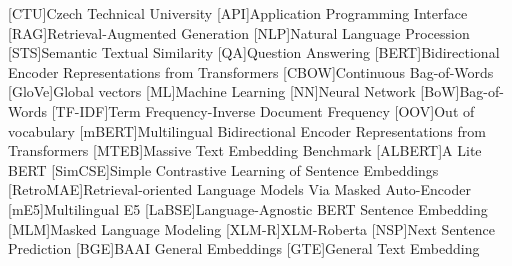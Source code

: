 
\begin{acronym}
  [CTU]{Czech Technical University}
  [API]{Application Programming Interface}
  [RAG]{Retrieval-Augmented Generation}
  [NLP]{Natural Language Procession}
  [STS]{Semantic Textual Similarity}
  [QA]{Question Answering}
  [BERT]{Bidirectional Encoder Representations from Transformers}
  [CBOW]{Continuous Bag-of-Words}
  [GloVe]{Global vectors}
  [ML]{Machine Learning}
  [NN]{Neural Network}
  [BoW]{Bag-of-Words}
  [TF-IDF]{Term Frequency-Inverse Document Frequency}
  [OOV]{Out of vocabulary}
  [mBERT]{Multilingual Bidirectional Encoder Representations from Transformers}
  [MTEB]{Massive Text Embedding Benchmark}
  [ALBERT]{A Lite BERT}
  [SimCSE]{Simple Contrastive Learning of Sentence Embeddings}
  [RetroMAE]{Retrieval-oriented Language Models Via Masked Auto-Encoder}
  [mE5]{Multilingual E5}
  [LaBSE]{Language-Agnostic BERT Sentence Embedding}
  [MLM]{Masked Language Modeling}
  [XLM-R]{XLM-Roberta}
  [NSP]{Next Sentence Prediction}
  [BGE]{BAAI General Embeddings}
  [GTE]{General Text Embedding}
\end{acronym}

